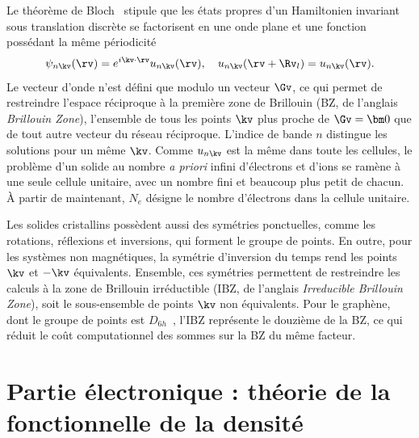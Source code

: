 Le théorème de Bloch~\cite{blochUeberQuantenmechanikElektronen1929} stipule que les états propres d'un Hamiltonien invariant sous translation discrète se factorisent en une onde plane et une fonction possédant la même périodicité
\begin{equation}
    \psi_{n\kv}(\rv)=e^{i\kv\cdot\rv}u_{n\kv}(\rv),\quad u_{n\kv}(\rv+\Rv_l)=u_{n\kv}(\rv).
    \label{eqn:c2_bloch_thm}
\end{equation}
Le vecteur d'onde n'est défini que modulo un vecteur $\Gv$, ce qui permet de restreindre l'espace réciproque à la première zone de Brillouin (BZ, de l'anglais \textit{Brillouin Zone}), l'ensemble de tous les points $\kv$ plus proche de $\Gv=\bm 0$ que de tout autre vecteur du réseau réciproque. L'indice de bande $n$ distingue les solutions pour un même $\kv$. Comme $u_{n\kv}$ est la même dans toute les cellules, le problème d'un solide au nombre \textit{a priori} infini d'électrons et d'ions se ramène à une seule cellule unitaire, avec un nombre fini et beaucoup plus petit de chacun. À partir de maintenant, $N_e$ désigne le nombre d'électrons dans la cellule unitaire.

Les solides cristallins possèdent aussi des symétries ponctuelles, comme les rotations, réflexions et inversions, qui forment le groupe de points. En outre, pour les systèmes non magnétiques, la symétrie d'inversion du temps rend les points $\kv$ et $-\kv$ équivalents. Ensemble, ces symétries permettent de restreindre les calculs à la zone de Brillouin irréductible (IBZ, de l'anglais \textit{Irreducible Brillouin Zone}), soit le sous-ensemble de points $\kv$ non équivalents. Pour le graphène, dont le groupe de points est $D_{6h}$~\cite{dresselhausPhysicalPropertiesCarbon1998,castronetoElectronicPropertiesGraphene2009}, l'IBZ représente le douzième de la BZ, ce qui réduit le coût computationnel des sommes sur la BZ du même facteur.

\section{Partie électronique : théorie de la fonctionnelle de la densité}\label{sec:électrons}

